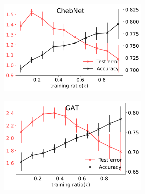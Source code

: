 \documentclass[9pt,twocolumn]{pnas-new}
\begin{document}
\begin{figure}[ht]
        \centering
        \begin{subfigure}[b]{0.475\textwidth}
            \centering
            \includegraphics[width=0.8\textwidth]{fig/G_ChebConv_ci.pdf}
            \caption{}\label{fig_moreGNN:a}
        \end{subfigure}
        \hfill
        \begin{subfigure}[b]{0.475\textwidth}  
            \centering 
            \includegraphics[width=0.8\textwidth]{fig/G_GAT_ci.pdf}
            \caption{}\label{fig_moreGNN:b}
        \end{subfigure}


\end{figure}
\end{document}
